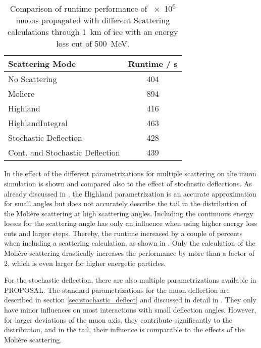 \begin{table}
    \caption{Comparison of runtime performance of \num{e6} muons propagated with different Scattering calculations through \SI{1}{km} of ice with an energy loss cut of \SI{500}{MeV}.}
    \label{tab:scatter_runtime}
    \begin{center}
    \begin{tabular}{l | c }
        \toprule
        Scattering Mode & Runtime / s \\
        \midrule
        No Scattering & 404 \\
        Moliere & 894 \\
        Highland & 416 \\
        HighlandIntegral & 463 \\
        Stochastic Deflection & 428 \\
        Cont. and Stochastic Deflection & 439 \\
        \bottomrule
    \end{tabular}
    \end{center}
\end{table}

In  the effect of the different parametrizations for multiple scattering on the muon simulation is shown and compared also to the effect of stochastic deflections.
As already discussed in , the Highland parametrization is an accurate approximation for small angles but does not accurately describe the tail in the distribution of the Moli\`{e}re scattering at high scattering angles.
Including the continuous energy losses for the scattering angle has only an influence when using higher energy loss cuts and larger steps.
Thereby, the runtime increased by a couple of percents when including a scattering calculation, as shown in .
Only the calculation of the Moli\`{e}re scattering drastically increases the performance by more than a factor of 2, which is even larger for higher energetic particles.

For the stochastic deflection, there are also multiple parametrizations available in PROPOSAL.
The standard parametrizations for the muon deflection are described in section \ref{sec:stochastic_deflect} and discussed in detail in \cite{Gutjahr21Master}.
They only have minor influences on most interactions with small deflection angles.
However, for larger deviations of the muon axis, they contribute significantly to the distribution, and in the tail, their influence is comparable to the effects of the Moli\`{e}re scattering.

